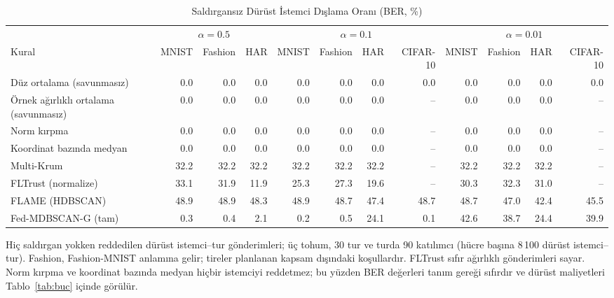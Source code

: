 \begin{table}[!tp]
\centering\footnotesize
\setlength{\tabcolsep}{4pt}
\caption{Saldırgansız Dürüst İstemci Dışlama Oranı (BER, \%)}\label{tab:ber}
\begin{adjustbox}{max width=\textwidth}
\begin{tabular}{lrrrrrrrrrrr}
\toprule
& \multicolumn{3}{c}{$\alpha=0.5$} & \multicolumn{4}{c}{$\alpha=0.1$} & \multicolumn{4}{c}{$\alpha=0.01$} \\
\cmidrule(lr){2-4}\cmidrule(lr){5-8}\cmidrule(lr){9-12}
Kural & MNIST & Fashion & HAR & MNIST & Fashion & HAR & CIFAR-10 & MNIST & Fashion & HAR & CIFAR-10 \\
\midrule
Düz ortalama (savunmasız) & 0.0 & 0.0 & 0.0 & 0.0 & 0.0 & 0.0 & 0.0 & 0.0 & 0.0 & 0.0 & 0.0 \\
Örnek ağırlıklı ortalama (savunmasız) & 0.0 & 0.0 & 0.0 & 0.0 & 0.0 & 0.0 & -- & 0.0 & 0.0 & 0.0 & -- \\
Norm kırpma & 0.0 & 0.0 & 0.0 & 0.0 & 0.0 & 0.0 & -- & 0.0 & 0.0 & 0.0 & -- \\
Koordinat bazında medyan & 0.0 & 0.0 & 0.0 & 0.0 & 0.0 & 0.0 & -- & 0.0 & 0.0 & 0.0 & -- \\
Multi-Krum & 32.2 & 32.2 & 32.2 & 32.2 & 32.2 & 32.2 & -- & 32.2 & 32.2 & 32.2 & -- \\
FLTrust (normalize) & 33.1 & 31.9 & 11.9 & 25.3 & 27.3 & 19.6 & -- & 30.3 & 32.3 & 31.0 & -- \\
FLAME (HDBSCAN) & 48.9 & 48.9 & 48.3 & 48.9 & 48.7 & 47.4 & 48.7 & 48.7 & 47.0 & 42.4 & 45.5 \\
Fed-MDBSCAN-G (tam) & 0.3 & 0.4 & 2.1 & 0.2 & 0.5 & 24.1 & 0.1 & 42.6 & 38.7 & 24.4 & 39.9 \\
\bottomrule
\end{tabular}
\end{adjustbox}

\par\vspace{3pt}\parbox{\linewidth}{\footnotesize Hiç saldırgan yokken reddedilen dürüst istemci--tur gönderimleri; üç tohum, 30 tur ve turda 90 katılımcı (hücre başına 8\,100 dürüst istemci--tur). Fashion, Fashion-MNIST anlamına gelir; tireler planlanan kapsam dışındaki koşullardır. FLTrust sıfır ağırlıklı gönderimleri sayar. Norm kırpma ve koordinat bazında medyan hiçbir istemciyi reddetmez; bu yüzden BER değerleri tanım gereği sıfırdır ve dürüst maliyetleri Tablo~\ref{tab:buc} içinde görülür.}
\end{table}
